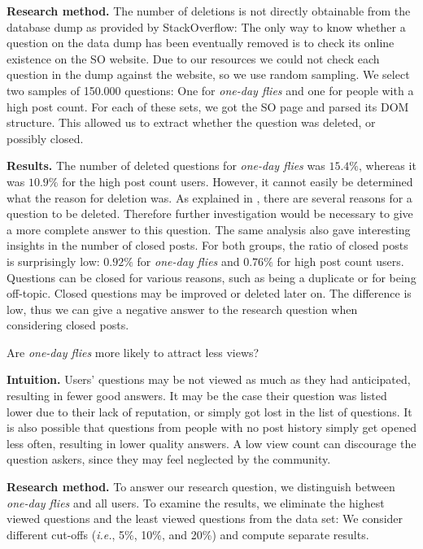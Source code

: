 \documentclass[conference]{IEEEtran}
\newcommand{\ie}{\emph{i.e.},\xspace}
\newcommand{\nb}[3]{
  \fcolorbox{black}{#2}{\bfseries\sffamily\scriptsize#1}
    {\sf\small$\blacktriangleright$\textit{#3}$\blacktriangleleft$}
}
\newcommand\AB[1]{\nb{alberto}{cyan}{#1}}
\newcommand\odf{\emph{one-day flies}\xspace}
\begin{document}
\textbf{Research method.} The number of deletions is not directly obtainable
from the database dump as provided by StackOverflow: The only way to know
whether a question on the data dump has been eventually removed is to check its
online existence on the SO website. Due to our resources we could not check
each question in the dump against the website, so we use random sampling. We
select two samples of 150.000 questions: One for \odf and one for people with a
high post count. %
For each of these sets, we got the SO page and parsed its DOM structure. This
allowed us to extract whether the question was deleted, or possibly closed.

\textbf{Results.} The number of deleted questions for \odf was $15.4\%$,
whereas it was $10.9\%$ for the high post count users. However, it cannot
easily be determined what the reason for deletion was. As explained in
\cite{correa2014chaff}, there are several reasons for a question to be deleted.
Therefore further investigation would be
necessary to give a more complete answer to this question.  The same analysis
also gave interesting insights in the number of closed posts.  For both groups,
the ratio of closed posts is surprisingly low: $0.92\%$ for \odf and $0.76\%$
for high post count users. Questions can be closed for various reasons, such as
being a duplicate or for being off-topic. Closed questions may be improved or
deleted later on. The difference is low, thus we can give a 
negative answer to the research question when considering closed posts.\\ 


\begin{tcolorbox}[size=fbox,title=RQ4: View Count]
Are \odf more likely to attract less views? 
\end{tcolorbox}

\textbf{Intuition.} Users' questions may be not
viewed as much as they had anticipated, resulting in fewer good answers. It may
be the case their question was listed lower due to their lack of reputation, or
simply got lost in the list of questions. It is also possible
that questions from people with no post history simply get opened less often,
resulting in lower quality answers. A low view count can discourage the 
question askers, since they may feel neglected by the community. 
 
\textbf{Research method.} To answer our research question, we distinguish
between \odf and all users. To examine the results,
we eliminate the highest viewed questions and the least
viewed questions  from the data set: We consider different cut-offs
(\ie 5\%, 10\%, and 20\%) and compute separate results. 
 
\end{document}
